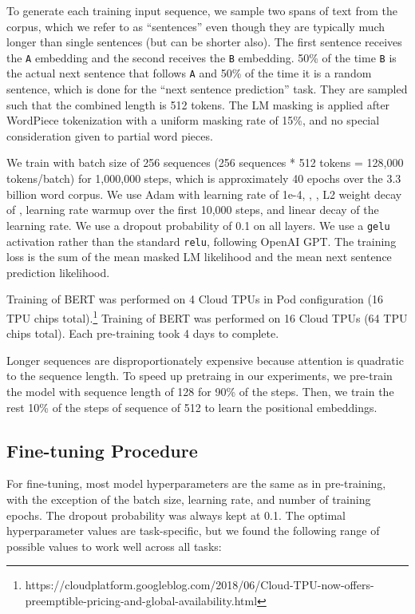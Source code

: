 \documentclass[11pt,a4paper]{article}
\newcommand\bertbase{BERT\xspace}
\newcommand\bertlarge{BERT\xspace}
\begin{document}
To generate each training input sequence, we sample two spans of text from the corpus, which we refer to as ``sentences'' even though they are typically much longer than single sentences (but can be shorter also). The first sentence receives the {\tt A} embedding and the second receives the {\tt B} embedding. 50\% of the time {\tt B} is the actual next sentence that follows {\tt A} and 50\% of the time it is a random sentence, which is done for the ``next sentence prediction'' task. They are sampled such that the combined length is  512 tokens. The LM masking is applied after WordPiece tokenization with a uniform masking rate of 15\%, and no special consideration given to partial word pieces.

We train with batch size of 256 sequences (256 sequences * 512 tokens = 128,000 tokens/batch) for 1,000,000 steps, which is approximately 40 epochs over the 3.3 billion word corpus. We use Adam with learning rate of 1e-4, , , L2 weight decay of , learning rate warmup over the first 10,000 steps, and linear decay of the learning rate. We use a dropout probability of 0.1 on all layers. We use a {\tt gelu} activation \cite{hendrycks:2016} rather than the standard {\tt relu}, following OpenAI GPT. The training loss is the sum of the mean masked LM likelihood and the mean next sentence prediction likelihood.

Training of \bertbase was performed on 4 Cloud TPUs in Pod configuration (16 TPU chips total).\footnote{https://cloudplatform.googleblog.com/2018/06/Cloud-TPU-now-offers-preemptible-pricing-and-global-availability.html} Training of \bertlarge was performed on 16 Cloud TPUs (64 TPU chips total). Each pre-training took 4 days to complete.

Longer sequences are disproportionately expensive because attention is quadratic to the sequence length. To speed up pretraing in our experiments, we pre-train the model with sequence length of 128 for 90\% of the steps. Then, we train
the rest 10\% of the steps of sequence of 512 to learn the positional embeddings.

\subsection{Fine-tuning Procedure}
For fine-tuning, most model hyperparameters are the same as in pre-training, with the exception of the batch size, learning rate, and number of training epochs. The dropout probability was always kept at 0.1. The optimal hyperparameter values are task-specific, but we found the following range of possible values to work well across all tasks:
\end{document}
